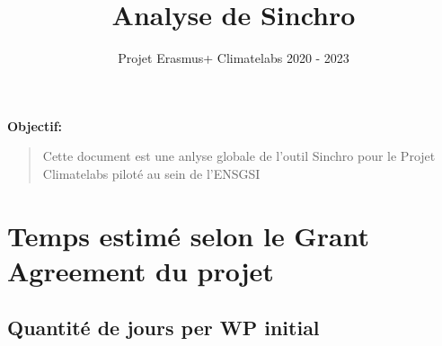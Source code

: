 \documentclass[
  a4paperpaper,
  onecolumn]{article}
\title{Analyse de Sinchro}
\subtitle{Projet Erasmus+ Climatelabs \textbar{} 2020 - 2023}
\author{}
\date{}
\begin{document}
\maketitle
\ifdefined\Shaded\renewenvironment{Shaded}{\begin{tcolorbox}[boxrule=0pt, borderline west={3pt}{0pt}{shadecolor}, frame hidden, sharp corners, interior hidden, breakable, enhanced]}{\end{tcolorbox}}\fi

\thispagestyle{fancy}

\textbf{Objectif:}

\begin{quote}
Cette document est une anlyse globale de l'outil Sinchro pour le Projet
Climatelabs piloté au sein de l'ENSGSI
\end{quote}

\hypertarget{temps-estimuxe9-selon-le-grant-agreement-du-projet}{%
\section{Temps estimé selon le Grant Agreement du
projet}\label{temps-estimuxe9-selon-le-grant-agreement-du-projet}}

\hypertarget{quantituxe9-de-jours-per-wp-initial}{%
\subsection{Quantité de jours per WP
initial}\label{quantituxe9-de-jours-per-wp-initial}}
\end{document}

